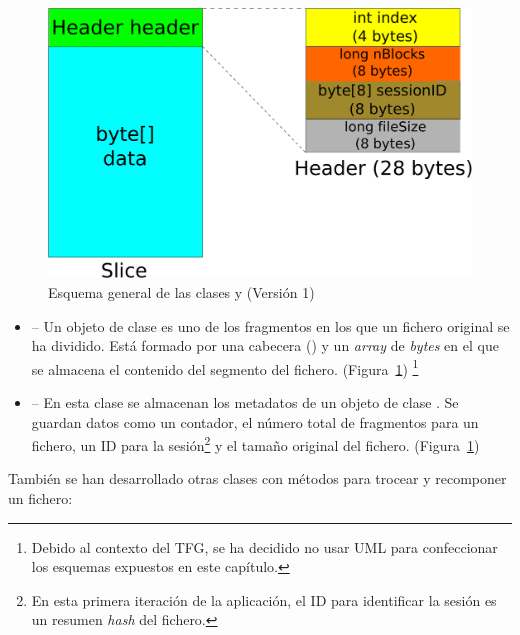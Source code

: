 \begin{figure}[!htb]
  \centering
  \includegraphics[scale=0.4]{Figures/Slice_Header_1}
  \decoRule
  \caption[ -  (Versión 1)]{Esquema general de las clases  y  (Versión 1)}
  \label{fig:Slice_Header_1}
\end{figure}

\begin{itemize}
  \item {} -- Un objeto de clase  es uno de los fragmentos en los que un fichero original se ha dividido. Está formado por una cabecera () y un \emph{array} de \emph{bytes} en el que se almacena el contenido del segmento del fichero. (Figura~\ref{fig:Slice_Header_1}) \footnote{Debido al contexto del TFG, se ha decidido no usar UML para confeccionar los esquemas expuestos en este capítulo.}

  \item {} -- En esta clase se almacenan los metadatos de un objeto de clase . Se guardan datos como un contador, el número total de fragmentos para un fichero, un ID para la sesión\footnote{En esta primera iteración de la aplicación, el ID para identificar la sesión es un resumen \emph{hash} del fichero.} y el tamaño original del fichero. (Figura~\ref{fig:Slice_Header_1})
\end{itemize}

También se han desarrollado otras clases con métodos para trocear y recomponer un fichero:

